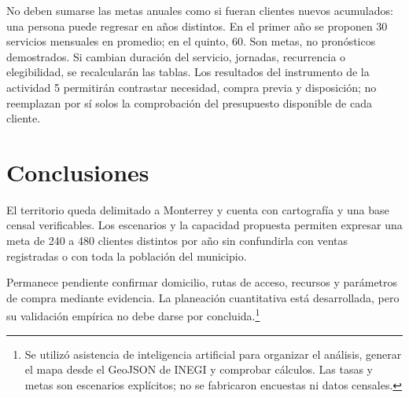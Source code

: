 {No deben sumarse las metas anuales como si fueran clientes nuevos acumulados: una persona puede regresar en años distintos. En el primer año se proponen 30 servicios mensuales en promedio; en el quinto, 60. Son metas, no pronósticos demostrados. Si cambian duración del servicio, jornadas, recurrencia o elegibilidad, se recalcularán las tablas. Los resultados del instrumento de la actividad 5 permitirán contrastar necesidad, compra previa y disposición; no reemplazan por sí solos la comprobación del presupuesto disponible de cada cliente.

\section{Conclusiones}

El territorio queda delimitado a Monterrey y cuenta con cartografía y una base censal verificables. Los escenarios y la capacidad propuesta permiten expresar una meta de 240 a 480 clientes distintos por año sin confundirla con ventas registradas o con toda la población del municipio.

Permanece pendiente confirmar domicilio, rutas de acceso, recursos y parámetros de compra mediante evidencia. La planeación cuantitativa está desarrollada, pero su validación empírica no debe darse por concluida.\footnote{Se utilizó asistencia de inteligencia artificial para organizar el análisis, generar el mapa desde el GeoJSON de INEGI y comprobar cálculos. Las tasas y metas son escenarios explícitos; no se fabricaron encuestas ni datos censales.}
}

